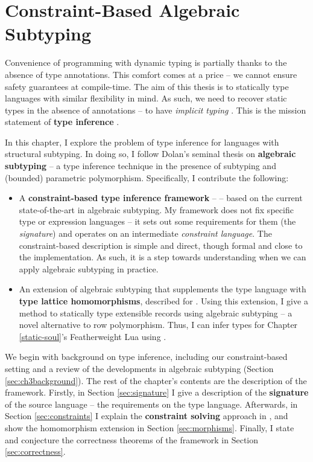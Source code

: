 \newenvironment{example}{%
\begin{tcolorbox}[%
    colback=blue!5!white,%
    colframe=blue!60!black,%
    title=\textsc{Example}%
]%
}{%
\end{tcolorbox}%
}

\chapter{Constraint-Based Algebraic Subtyping}
\label{algebraic-subtyping}

Convenience of programming with dynamic typing is partially thanks to the absence of type annotations. 
This comfort comes at a price -- we cannot ensure safety guarantees at compile-time. 
The aim of this thesis is to statically type languages with similar flexibility in mind. As such, we need to recover static types in the absence of annotations -- to have \emph{implicit typing} \cite{remy-record-inference}. This is the mission statement of \textbf{type inference} \cite{tapl}.

In this chapter, I explore the problem of type inference for languages with structural subtyping. In doing so, I follow Dolan's seminal thesis on \textbf{algebraic subtyping} -- a type inference technique in the presence of subtyping and (bounded) parametric polymorphism. Specifically, I contribute the following:
\begin{itemize}
    \item A \textbf{constraint-based type inference framework} -- \inference{} -- based on the current state-of-the-art in algebraic subtyping. My framework does not fix specific type or expression languages -- it sets out some requirements for them (the \textit{signature}) and operates on an intermediate \emph{constraint language}. The constraint-based description is simple and direct, though formal and close to the implementation. As such, it is a step towards understanding when we can apply algebraic subtyping in practice.
    \item An extension of algebraic subtyping that supplements the type language with \textbf{type lattice homomorphisms}, described for \inference{}. Using this extension, I give a method to statically type extensible records using algebraic subtyping -- a novel alternative to row polymorphism. Thus, I can infer types for Chapter \ref{static-soul}'s Featherweight Lua using \inference{}.
\end{itemize}

We begin with background on type inference, including our constraint-based setting and a review of the developments in algebraic subtyping (Section \ref{sec:ch3background}). The rest of the chapter's contents are the description of the framework. Firstly, in Section \ref{sec:signature} I give a description of the \textbf{signature} of the source language -- the requirements on the type language. Afterwards, in Section \ref{sec:constraints} I explain the \textbf{constraint solving} approach in \inference{}, and show the homomorphism extension in Section \ref{sec:morphisms}. Finally, I state and conjecture the correctness theorems of the framework in Section \ref{sec:correctness}. 

